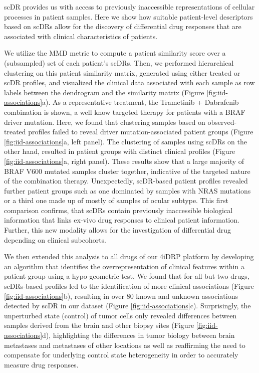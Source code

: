 scDR provides us with access to previously inaccessible representations of cellular processes in patient samples.
Here we show how suitable patient-level descriptors based on scDRs allow for the discovery of differential drug responses that are associated with clinical characteristics of patients.

We utilize the MMD metric to compute a patient similarity score over a (subsampled) set of each patient's scDRs.
Then, we performed hierarchical clustering on this patient similarity matrix, generated using either treated or scDR profiles,
and visualized the clinical data associated with each sample as row labels between the dendrogram and the similarity matrix (Figure \ref{fig:iid-associations}a).
As a representative treatment, the Trametinib + Dabrafenib combination is shown, a well know targeted therapy for patients with a BRAF driver mutation.
Here, we found that clustering samples based on observed-treated profiles failed to reveal driver mutation-associated patient groups (Figure \ref{fig:iid-associations}a, left panel).
The clustering of samples using scDRs on the other hand, resulted in patient groups with distinct clinical profiles (Figure \ref{fig:iid-associations}a, right panel).
These results show that a large majority of BRAF V600 mutated samples cluster together, indicative of the targeted nature of the combination therapy.
 Unexpectedly, scDR-based patient profiles revealed further patient groups such as one dominated by samples with NRAS mutations or a third one made up of mostly of samples of ocular subtype.
 This first comparison confirms, that scDRs contain previously inaccessible biological information that links ex-vivo drug responses to clinical patient information.
 Further, this new modality allows for the investigation of differential drug depending on clinical subcohorts. 

We then extended this analysis to all drugs of our 4iDRP platform by developing an algorithm that identifies the overrepresentation of clinical features within a patient group using a hypo-geometric test.
 We found that for all but two drugs, scDRs-based profiles led to the identification of more clinical associations (Figure \ref{fig:iid-associations}b),
 resulting in over 80 known and unknown associations detected by scDR in our dataset (Figure \ref{fig:iid-associations}c).
 Surprisingly, the unperturbed state (control) of tumor cells only revealed differences between samples derived from the brain and other biopsy sites (Figure \ref{fig:iid-associations}d),
 highlighting the differences in tumor biology between brain metastases and metastases of other locations \cite{eichler2011}
 as well as reaffirming the need to compensate for underlying control state heterogeneity in order to accurately measure drug responses.

